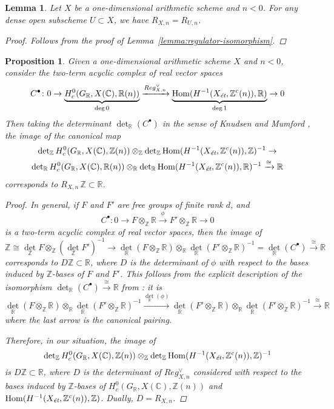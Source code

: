 \documentclass[draft]{article}
\DeclareMathOperator{\Hom}{Hom}
\newcommand{\CC}{\mathbb{C}}
\newcommand{\RR}{\mathbb{R}}
\newcommand{\ZZ}{\mathbb{Z}}
\renewcommand{\det}{\operatorname{det}}
\newcommand{\et}{\text{\it \'{e}t}}
\theoremstyle{myplain}
\newtheorem{proposition}[theorem]{Proposition}
\newtheorem{lemma}[theorem]{Lemma}
\theoremstyle{mydefinition}
\begin{document}
\begin{lemma}
  \label{lemma:regulator-dense-open-subset}
  Let $X$ be a one-dimensional arithmetic scheme and $n < 0$. For any dense open
  subscheme $U \subset X$, we have $R_{X,n} = R_{U,n}$.

  \begin{proof}
    Follows from the proof of Lemma~\ref{lemma:regulator-isomorphism}.
  \end{proof}
\end{lemma}

\begin{proposition}
  \label{prop:trivialization-of-free-part}
  Given a one-dimensional arithmetic scheme $X$ and $n < 0$, consider the
  two-term acyclic complex of real vector spaces
  \[ C^\bullet\colon
    0 \to
    \underbrace{H^0_c (G_\RR, X(\CC), \RR(n))}_{\deg 0}
    \xrightarrow{Reg_{X,n}^\vee}
    \underbrace{\Hom (H^{-1} (X_\et, \ZZ^c (n)), \RR)}_{\deg 1}
    \to 0 \]
  Then taking the determinant $\det_\RR (C^\bullet)$ in the sense of
  Knudsen and Mumford \cite{Knudsen-Mumford-1976},
  the image of the canonical map
  \begin{multline*}
    \det_\ZZ H^0_c (G_\RR, X(\CC), \ZZ(n)) \otimes_\ZZ
    \det_\ZZ \Hom (H^{-1} (X_\et, \ZZ^c (n)), \ZZ)^{-1} \to \\
    \det_\RR H^0_c (G_\RR, X(\CC), \RR (n)) \otimes_\RR
    \det_\RR \Hom (H^{-1} (X_\et, \ZZ^c (n)), \RR)^{-1}
    \xrightarrow{\cong} \RR
  \end{multline*}
  corresponds to $R_{X,n}\,\ZZ \subset \RR$.

  \begin{proof}
    In general, if $F$ and $F'$ are free groups of finite rank $d$, and
    $$C^\bullet\colon 0 \to F\otimes_\ZZ \RR \xrightarrow{\phi} F'\otimes_\ZZ \RR \to 0$$
    is a two-term acyclic complex of real vector spaces, then the image of
    \[ \ZZ \cong \det_\ZZ F \otimes_\ZZ (\det_\ZZ F')^{-1} \to
      \det_\RR (F\otimes_\ZZ \RR) \otimes_\RR \det_\RR (F' \otimes_\ZZ \RR)^{-1}
      = \det_\RR (C^\bullet) \xrightarrow{\cong} \RR \]
    corresponds to $D\ZZ \subset \RR$, where $D$ is the determinant of $\phi$ with
    respect to the bases induced by $\ZZ$-bases of $F$ and $F'$.
    This follows from the explicit description of the isomorphism
    $\det_\RR (C^\bullet) \xrightarrow{\cong} \RR$ from
    \cite[p.\,33]{Knudsen-Mumford-1976}: it is
    \[ \det_\RR (F \otimes_\ZZ \RR) \otimes_\RR
      \det_\RR (F'\otimes_\ZZ \RR)^{-1} \xrightarrow{\det_\RR (\phi)}
      \det_\RR (F' \otimes_\ZZ \RR) \otimes_\RR
      \det_\RR (F' \otimes_\ZZ \RR)^{-1} \xrightarrow{\cong} \RR \]
    where the last arrow is the canonical pairing.

    Therefore, in our situation, the image of
    \[ \det_\ZZ H^0_c (G_\RR, X(\CC), \ZZ(n)) \otimes_\ZZ
      \det_\ZZ \Hom (H^{-1} (X_\et, \ZZ^c (n)), \ZZ)^{-1} \]
    is $D \ZZ \subset \RR$, where $D$ is the determinant of $Reg_{X,n}^\vee$
    considered with respect to the bases induced by $\ZZ$-bases of
    $H^0_c (G_\RR, X(\CC), \ZZ(n))$ and
    $\Hom (H^{-1} (X_\et, \ZZ^c (n)), \ZZ)$. Dually, $D = R_{X,n}$.
  \end{proof}
\end{proposition}
\end{document}
